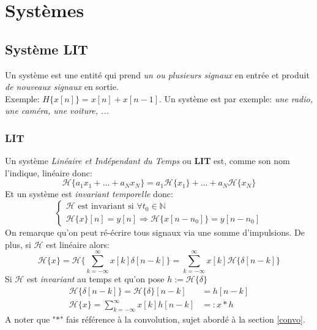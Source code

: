 \documentclass{report}
\begin{document}
\part{Systèmes}

\chapter{Système LIT}
Un système est une entité qui prend \textit{un ou plusieurs signaux} en entrée et produit \textit{de nouveaux signaux} en sortie.\\
Exemple: $H\{x[n]\} = x[n] + x[n-1]$. Un système est par exemple: \textit{une radio, une caméra, une voiture, ...}

\section{LIT}
Un système \textit{Linéaire et Indépendant du Temps} ou \textbf{LIT} est, comme son nom l'indique, linéaire donc:
\begin{equation}
\mathcal{H}\{a_1x_1 + ... + a_Nx_N\} = a_1\mathcal{H}\{x_1\} + ... + a_N\mathcal{H}\{x_N\} 
\end{equation}
Et un système est \textit{invariant temporelle} donc:
\begin{equation}
\begin{cases}
\mathcal{H} \text{ est invariant si } \forall t_0 \in \mathbb{N}\\
\mathcal{H}\{x\}[n] = y[n] \Rightarrow \mathcal{H}\{x[n-n_0]\} = y[n-n_0]
\end{cases}
\end{equation}
On remarque qu'on peut ré-écrire tous signaux via une somme d'impulsions. De plus, si $\mathcal{H}$ est linéaire alors:
\begin{equation}
\mathcal{H}\{x\} = \mathcal{H}\biggl\{\sum_{k= -\infty}^{\infty} x[k]\delta[n-k] \biggl\} = \sum_{k=-\infty}^{\infty} x[k]\mathcal{H}\{\delta[n-k]\}
\end{equation}
Si $\mathcal{H}$ est \textit{invariant} au temps et qu'on pose $h := \mathcal{H}\{\delta\}$
\begin{align}
\mathcal{H}\{\delta[n-k]\} = \mathcal{H}\{\delta\}[n-k] &= h[n-k]\\
\mathcal{H}\{x\} = \sum_{k=-\infty}^{\infty} x[k]h[n-k] &=: x \ast h
\end{align}
A noter que "$\ast$" fais référence à la convolution, sujet abordé à la section \ref{convo}.\\
\end{document}
